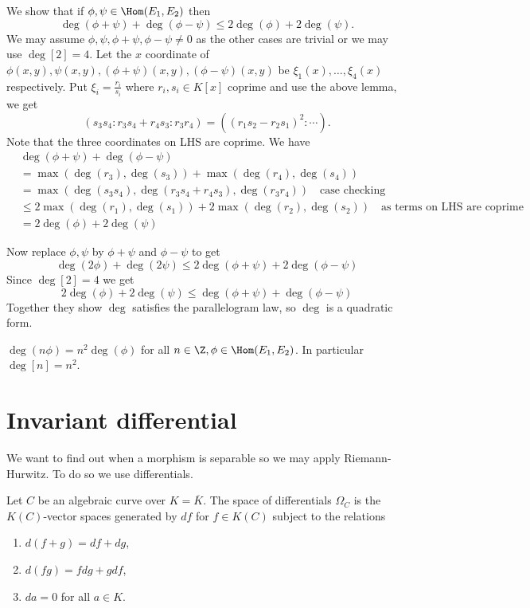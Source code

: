 \documentclass[a4paper]{article}
\theoremstyle{definition}
\begin{document}
We show that if \(\phi, \psi \in \Hom(E_1, E_2)\) then
\[
  \deg (\phi + \psi) + \deg (\phi - \psi) \leq 2 \deg(\phi) + 2 \deg(\psi).
\]
We may assume \(\phi, \psi, \phi + \psi, \phi - \psi \neq 0\) as the other cases are trivial or we may use \(\deg [2] = 4\). Let the \(x\) coordinate of \(\phi(x, y), \psi(x, y), (\phi + \psi)(x, y), (\phi - \psi)(x, y)\) be \(\xi_1(x), \dots, \xi_4(x)\) respectively. Put \(\xi_i = \frac{r_i}{s_i}\) where \(r_i, s_i \in K[x]\) coprime and use the above lemma, we get
\[
  (s_3s_4: r_3s_4 + r_4s_3: r_3r_4) = ((r_1s_2 - r_2s_1)^2: \cdots ).
\]
Note that the three coordinates on LHS are coprime. We have
\begin{align*}
  &\deg (\phi + \psi) + \deg (\phi - \psi) \\
  &= \max(\deg (r_3), \deg (s_3)) + \max (\deg (r_4), \deg (s_4)) \\
  &= \max(\deg (s_3s_4), \deg (r_3s_4 + r_4s_3), \deg (r_3r_4)) \quad \text{case checking} \\
  &\leq 2 \max(\deg(r_1), \deg(s_1)) + 2 \max(\deg (r_2), \deg (s_2)) \quad \text{as terms on LHS are coprime} \\
  &= 2 \deg (\phi) + 2 \deg (\psi)
\end{align*}

Now replace \(\phi, \psi\) by \(\phi + \psi\) and \(\phi - \psi\) to get
\[
  \deg (2\phi) + \deg (2\psi) \leq 2 \deg (\phi + \psi) + 2 \deg(\phi - \psi)
\]
Since \(\deg [2] = 4\) we get
\[
  2 \deg (\phi) + 2 \deg (\psi) \leq \deg (\phi + \psi) + \deg (\phi - \psi)
\]
Together they show \(\deg\) satisfies the parallelogram law, so \(\deg\) is a quadratic form.

\begin{corollary}
  \(\deg (n\phi) = n^2 \deg (\phi)\) for all \(n \in \Z, \phi \in \Hom(E_1, E_2)\). In particular \(\deg [n] = n^2\).
\end{corollary}

\section{Invariant differential}

We want to find out when a morphism is separable so we may apply Riemann-Hurwitz. To do so we use differentials.

Let \(C\) be an algebraic curve over \(K = \overline K\). The space of differentials \(\Omega_C\) is the \(K(C)\)-vector spaces generated by \(df\) for \(f \in K(C)\) subject to the relations
\begin{enumerate}
\item \(d(f + g) = df + dg\),
\item \(d(fg) = f dg + g df\),
\item \(da = 0\) for all \(a \in K\).
\end{enumerate}
\end{document}
